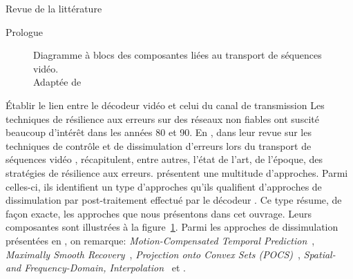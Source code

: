 \documentclass[letterpaper, twoside, 12pt,memoire]{thETS}
\newcommand{\fig}[1]{figure~\ref{#1}}
\begin{document}
\begin{chapter}{Revue de la littérature}
\begin{section}{Prologue}
\begin{figure}
\caption{Diagramme à blocs des composantes liées au transport de séquences
vidéo.\\Adaptée de \citet[p.~976]{Wang1998}}
\label{fig-VideoCommunication}
\end{figure}

\end{section}

\begin{section}{Établir le lien entre le décodeur vidéo et celui du canal de
transmission}
\label{sect-SourceChannel}
Les techniques de résilience aux erreurs sur des réseaux non fiables ont suscité
beaucoup d'intérêt dans les années 80 et 90. En \citeyear{Wang1998}, dans leur
revue sur les techniques de contrôle et de dissimulation d'erreurs lors du
transport de séquences vidéo \citep{Wang1998}, \citeauthor{Wang1998}
récapitulent, entre autres, l'état de l'art, de l'époque, des stratégies de
résilience aux erreurs. \citeauthor{Wang1998} présentent une multitude
d'approches. Parmi celles-ci, ils identifient un type d'approches qu'ils
qualifient d'approches de dissimulation par post-traitement effectué par le
décodeur \citep[Chap. 5]{Wang1998}. Ce type résume, de façon exacte, les
approches que nous présentons dans cet ouvrage. Leurs composantes sont
illustrées à la \fig{fig-VideoCommunication}. Parmi les approches de
dissimulation présentées en \citeyear{Wang1998}, on remarque:
\textit{Motion-Compensated Temporal Prediction}~\citep{Ghanbari1993},
\textit{Maximally Smooth Recovery}~\citep{Wang1993}, \textit{Projection onto
Convex Sets (POCS)}~\citep{Sun1995}, \textit{Spatial- and Frequency-Domain,
Interpolation}~\citep{Hemami1995} et \citep{Sun1992}.


\end{section}
\end{chapter}
\end{document}
